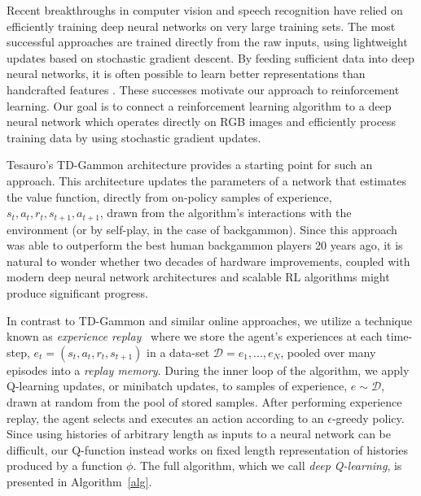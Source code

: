 
Recent breakthroughs in computer vision and speech recognition have relied on efficiently training deep neural networks on very large training sets.
The most successful approaches are trained directly from the raw inputs, using lightweight updates based on stochastic gradient descent. By feeding sufficient data into deep neural networks, it is often possible to learn better representations than handcrafted features \cite{krizhevsky-imagenet}. These successes motivate our approach to reinforcement learning. Our goal is to connect a reinforcement learning algorithm to a deep neural network which operates directly on RGB images and efficiently process training data by using stochastic gradient updates. 

Tesauro's TD-Gammon architecture provides a starting point for such an approach. This architecture updates the parameters of a network that estimates the value function, directly from on-policy samples of experience, $s_t, a_t, r_t, s_{t+1}, a_{t+1}$, drawn from the algorithm's interactions with the environment (or by self-play, in the case of backgammon). Since this approach was able to outperform the best human backgammon players 20 years ago, it is natural to wonder whether two decades of hardware improvements, coupled with modern deep neural network architectures and scalable RL algorithms might produce significant progress. 

In contrast to TD-Gammon and similar online approaches, we utilize a technique known as \emph{experience replay}~\cite{lin1993reinforcement} where we store the agent's experiences at each time-step, $e_t = (s_t, a_t, r_t, s_{t+1})$ in a data-set $\mathcal{D} = e_1, ..., e_N$, pooled over many episodes into a \emph{replay memory}. During the inner loop of the algorithm, we apply Q-learning updates, or minibatch updates, to samples of experience, $e \sim \mathcal{D}$, drawn at random from the pool of stored samples. After performing experience replay, the agent selects and executes an action according to an $\epsilon$-greedy policy. Since using histories of arbitrary length as inputs to a neural network can be difficult, our Q-function instead works on fixed length representation of histories produced by a function $\phi$. The full algorithm, which we call \emph{deep Q-learning}, is presented in Algorithm~\ref{alg}.

